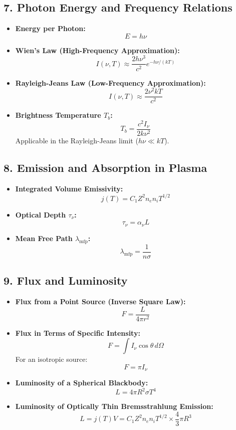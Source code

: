 \documentclass{article}
\begin{document}
\subsection*{7. Photon Energy and Frequency Relations}

\begin{itemize}
    \item \textbf{Energy per Photon:}
          \[
              E = h\nu
          \]
    \item \textbf{Wien's Law (High-Frequency Approximation):}
          \[
              I(\nu, T) \approx \frac{2h\nu^3}{c^2} e^{-h\nu/(kT)}
          \]
    \item \textbf{Rayleigh-Jeans Law (Low-Frequency Approximation):}
          \[
              I(\nu, T) \approx \frac{2\nu^2 k T}{c^2}
          \]
    \item \textbf{Brightness Temperature \( T_b \):}
          \[
              T_b = \frac{c^2 I_\nu}{2 k \nu^2}
          \]
          Applicable in the Rayleigh-Jeans limit (\( h\nu \ll kT \)).
\end{itemize}

\subsection*{8. Emission and Absorption in Plasma}

\begin{itemize}
    \item \textbf{Integrated Volume Emissivity:}
          \[
              j(T) = C_1 Z^2 n_e n_i T^{1/2}
          \]
    \item \textbf{Optical Depth \( \tau_\nu \):}
          \[
              \tau_\nu = \alpha_\nu L
          \]
    \item \textbf{Mean Free Path \( \lambda_{\text{mfp}} \):}
          \[
              \lambda_{\text{mfp}} = \frac{1}{n \sigma}
          \]
\end{itemize}

\subsection*{9. Flux and Luminosity}

\begin{itemize}
    \item \textbf{Flux from a Point Source (Inverse Square Law):}
          \[
              F = \frac{L}{4\pi r^2}
          \]
    \item \textbf{Flux in Terms of Specific Intensity:}
          \[
              F = \int I_\nu \cos \theta \, d\Omega
          \]
          For an isotropic source:
          \[
              F = \pi I_\nu
          \]
    \item \textbf{Luminosity of a Spherical Blackbody:}
          \[
              L = 4\pi R^2 \sigma T^4
          \]
    \item \textbf{Luminosity of Optically Thin Bremsstrahlung Emission:}
          \[
              L = j(T) V = C_1 Z^2 n_e n_i T^{1/2} \times \frac{4}{3}\pi R^3
          \]
\end{itemize}
\end{document}
